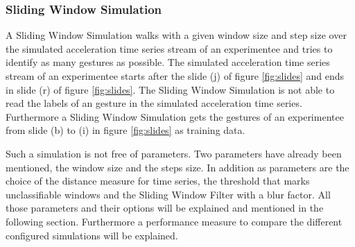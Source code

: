 \subsubsection{Sliding Window Simulation} \label{sliding_window_simulation}
A Sliding Window Simulation walks with a given window size and step size over the simulated acceleration time series
stream of an experimentee and tries to identify as many gestures as possible. The simulated acceleration time series
stream of an experimentee starts after the slide (j) of figure \ref{fig:slides} and ends in slide (r) of figure
\ref{fig:slides}. The Sliding Window Simulation is not able to read the labels of an gesture in the simulated
acceleration time series. Furthermore a Sliding Window Simulation gets the gestures of an experimentee from slide (b)
to (i) in figure \ref{fig:slides} as training data.

Such a simulation is not free of parameters. Two parameters have already been mentioned, the window size and the steps
size. In addition as parameters are the choice of the distance measure for time series, the threshold that marks
unclassifiable windows and the Sliding Window Filter with a blur factor. All those parameters and their options will be
explained and mentioned in the following section. Furthermore a performance measure to compare the different configured
simulations will be explained.




